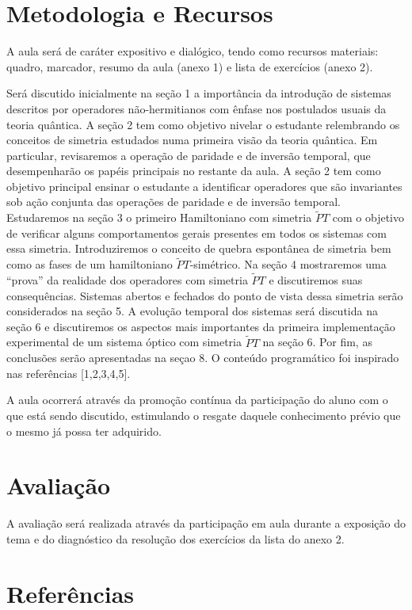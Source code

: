 \documentclass{article}
\begin{document}
\section{Metodologia e Recursos}

A aula será de caráter expositivo e dialógico, tendo como recursos materiais: quadro, marcador, resumo da aula (anexo 1) e lista de exercícios (anexo 2).


Será discutido inicialmente na seção 1 a importância da introdução de sistemas descritos por operadores não-hermitianos com ênfase nos postulados usuais da teoria quântica. A seção 2 tem como objetivo nivelar o estudante relembrando os conceitos de simetria estudados numa primeira visão da teoria quântica. Em particular, revisaremos a operação de paridade e de inversão temporal, que desempenharão os papéis principais no restante da aula. A seção 2 tem como objetivo principal ensinar o estudante a identificar operadores que são invariantes sob ação conjunta das operações de paridade e de inversão temporal. Estudaremos na seção 3 o primeiro Hamiltoniano com simetria $\tilde{P}T$ com o objetivo de verificar alguns comportamentos gerais presentes em todos os sistemas com essa simetria. Introduziremos o conceito de quebra espontânea de simetria bem como as fases de um hamiltoniano $\tilde{P}T$-simétrico. Na seção 4 mostraremos uma ``prova'' da realidade dos operadores com simetria $\tilde{P}T$ e discutiremos suas consequências. Sistemas abertos e fechados do ponto de vista dessa simetria serão considerados na seção 5. A evolução temporal dos sistemas será discutida na seção 6 e discutiremos os aspectos mais importantes da primeira implementação experimental de um sistema óptico com simetria $\tilde{P}T$ na seção 6. Por fim, as conclusões serão apresentadas na seçao 8. O conteúdo programático foi inspirado nas referências [1,2,3,4,5].

A aula ocorrerá através da promoção contínua da participação do aluno com o que está sendo discutido, estimulando o resgate daquele conhecimento prévio que o mesmo já possa ter adquirido.

\section{Avaliação}

A avaliação será realizada através da participação em aula durante a exposição do tema e do diagnóstico da resolução dos exercícios da lista do anexo 2. 

\section{Referências}
\end{document}
